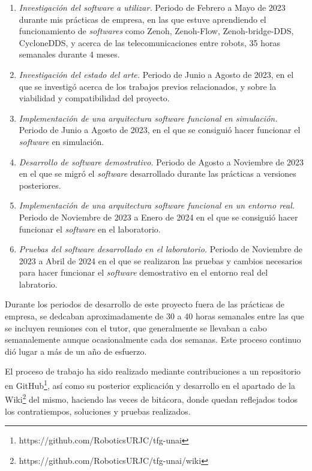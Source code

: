 \begin{enumerate}
    \item{\textit{Investigación del software a utilizar.} Periodo de Febrero a
        Mayo de 2023 durante mis prácticas de empresa, en las que estuve
        aprendiendo el funcionamiento de \textit{softwares} como Zenoh,
        Zenoh-Flow, Zenoh-bridge-DDS, CycloneDDS, y acerca de las
        telecomunicaciones entre robots, 35 horas semanales durante 4 meses.}
    \item{\textit{Investigación del estado del arte.} Periodo de Junio a Agosto
        de 2023, en el que se investigó acerca de los trabajos previos
        relacionados, y sobre la viabilidad y compatibilidad del proyecto.}
    \item{\textit{Implementación de una arquitectura software funcional en
        simulación.} Periodo de Junio a Agosto de 2023, en el que se consiguió
        hacer funcionar el \textit{software} en simulación.}
    \item{\textit{Desarrollo de software demostrativo.} Periodo de Agosto a
        Noviembre de 2023 en el que se migró el \textit{software} desarrollado
        durante las prácticas a versiones posteriores.}
    \item{\textit{Implementación de una arquitectura software funcional en un
        entorno real.} Periodo de Noviembre de 2023 a Enero de 2024 en el que se
        consiguió hacer funcionar el \textit{software} en el laboratorio.}
    \item{\textit{Pruebas del software desarrollado en el laboratorio.} Periodo
        de Noviembre de 2023 a Abril de 2024 en el que se realizaron las pruebas
        y cambios necesarios para hacer funcionar el \textit{software}
        demostrativo en el entorno real del labratorio.}
\end{enumerate}

Durante los periodos de desarrollo de este proyecto fuera de las prácticas de
empresa, se dedcaban aproximadamente de 30 a 40 horas semanales entre las que se
incluyen reuniones con el tutor, que generalmente se llevaban a cabo
semanalemente aunque ocasionalmente cada dos semanas.
Este proceso continuo dió lugar a más de un año de esfuerzo.

El proceso de trabajo ha sido realizado mediante contribuciones a un repositorio
en GitHub\footnote{https://github.com/RoboticsURJC/tfg-unai}, así como su
posterior explicación y desarrollo en el apartado de la
Wiki\footnote{https://github.com/RoboticsURJC/tfg-unai/wiki} del mismo, haciendo
las veces de bitácora, donde quedan reflejados todos los contratiempos,
soluciones y pruebas realizados.

